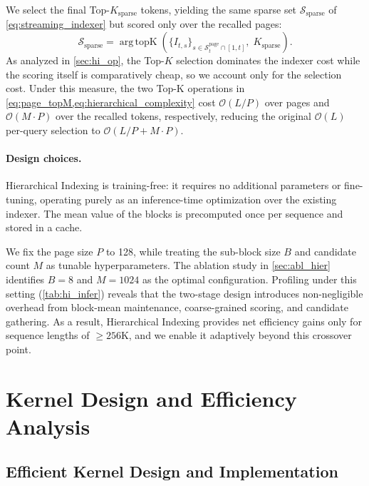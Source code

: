 \documentclass{article}
\begin{document}
We select the final Top-$K_{\text{sparse}}$ tokens, yielding the same sparse set $\mathcal{S}_{\text{sparse}}$ of \cref{eq:streaming_indexer} but scored only over the recalled pages:
\begin{equation}
\label{eq:hierarchical_complexity}
\mathcal{S}_{\text{sparse}} = \mathop{\mathrm{arg\,topK}}\left(\{I_{t,s}\}_{s \in \mathcal{S}_t^{\text{page}}\cap [1, t]},\; K_{\text{sparse}}\right).
\end{equation}
As analyzed in \cref{sec:hi_op}, the Top-$K$ selection dominates the indexer cost while the scoring itself is comparatively cheap, so we account only for the selection cost. Under this measure, the two Top-K operations in \cref{eq:page_topM,eq:hierarchical_complexity} cost $\mathcal{O}(L/P)$ over pages and $\mathcal{O}(M \cdot P)$ over the recalled tokens, respectively, reducing the original $\mathcal{O}(L)$ per-query selection to $\mathcal{O}(L/P + M \cdot P)$.

\paragraph{Design choices.}
Hierarchical Indexing is training-free: it requires no additional parameters or fine-tuning, operating purely as an inference-time optimization over the existing indexer. 
The mean value of the blocks is precomputed once per sequence and stored in a cache. 

We fix the page size $P$ to 128, while treating the sub-block size $B$ and candidate count $M$ as tunable hyperparameters. The ablation study in \cref{sec:abl_hier} identifies $B{=}8$ and $M{=}1024$ as the optimal configuration. Profiling under this setting (\cref{tab:hi_infer}) reveals that the two-stage design introduces non-negligible overhead from block-mean maintenance, coarse-grained scoring, and candidate gathering. As a result, Hierarchical Indexing provides net efficiency gains only for sequence lengths of $\ge256$K, and we enable it adaptively beyond this crossover point.

\section{Kernel Design and Efficiency Analysis}
\label{sec:efficiency}


\subsection{Efficient Kernel Design and Implementation}
\label{sec:kernel}
\end{document}
